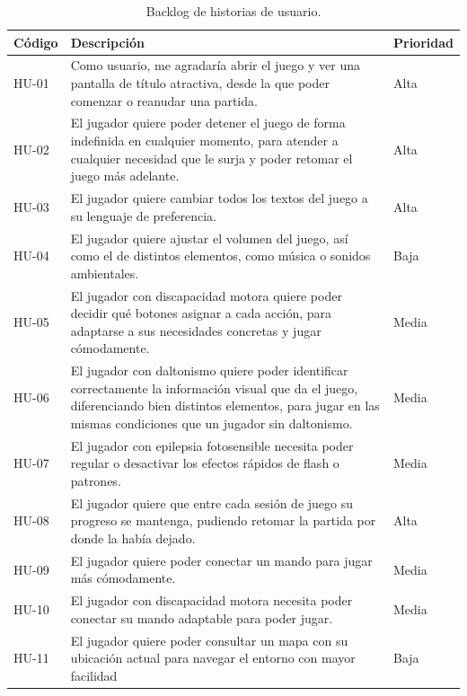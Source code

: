 \begin{table}[htb]
    \centering
    \begin{tabular}{|l|p{10cm}|l|}
    \hline
        Código & Descripción & Prioridad \\ \hline
        HU-01 & Como usuario, me agradaría abrir el juego y ver una pantalla de título atractiva, desde la que poder comenzar o reanudar una partida. & Alta \\ \hline
        HU-02 & El jugador quiere poder detener el juego de forma indefinida en cualquier momento, para atender a cualquier necesidad que le surja y poder retomar el juego más adelante. & Alta \\ \hline
        HU-03 & El jugador quiere cambiar todos los textos del juego a su lenguaje de preferencia. & Alta \\ \hline
        HU-04 & El jugador quiere ajustar el volumen del juego, así como el de distintos elementos, como música o sonidos ambientales. & Baja \\ \hline
        HU-05 & El jugador con discapacidad motora quiere poder decidir qué botones asignar a cada acción, para adaptarse a sus necesidades concretas y jugar cómodamente. & Media \\ \hline
        HU-06 & El jugador con daltonismo quiere poder identificar correctamente la información visual que da el juego, diferenciando bien distintos elementos, para jugar en las mismas condiciones que un jugador sin daltonismo. & Media \\ \hline
        HU-07 & El jugador con epilepsia fotosensible necesita poder regular o desactivar los efectos rápidos de flash o patrones. & Media \\ \hline
        HU-08 & El jugador quiere que entre cada sesión de juego su progreso se mantenga, pudiendo retomar la partida por donde la había dejado. & Alta \\ \hline
        HU-09 & El jugador quiere poder conectar un mando para jugar más cómodamente. & Media \\ \hline
        HU-10 & El jugador con discapacidad motora necesita poder conectar su mando adaptable para poder jugar. & Media \\ \hline
        HU-11 & El jugador quiere poder consultar un mapa con su ubicación actual para navegar el entorno con mayor facilidad & Baja \\ \hline
    \end{tabular}
    \caption{Backlog de historias de usuario.}
    \label{tab:backloghu}
\end{table}

